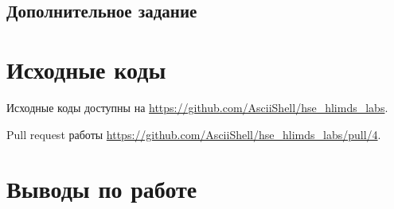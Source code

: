 \documentclass[a4paper,14pt]{article}
\begin{document}
	
	\subsection{Дополнительное задание}
	

    \section{Исходные коды}

    Исходные коды доступны на \href{https://github.com/AsciiShell/hse_hlimds_labs}
    {https://github.com/AsciiShell/hse\_hlimds\_labs}.

    Pull request работы \href{https://github.com/AsciiShell/hse_hlimds_labs/pull/4}
    {https://github.com/AsciiShell/hse\_hlimds\_labs/pull/4}.


    \section{Выводы по работе}
\end{document}
